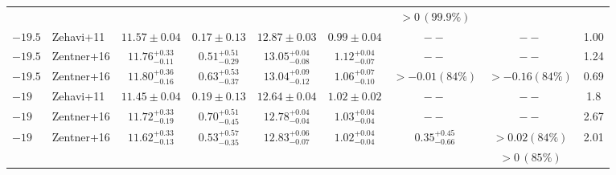\documentclass[usenatbib,usegraphicx,letterpaper]{mn2e}
\begin{document}
\begin{table}
{\begin{tabular}{l l c c c c c c c}
          &                     &                                         &                                       &                                         &                                      & $>0\, (99.9\%)$     &                                      & \vspace*{8pt}\\
$-19.5$ & Zehavi+11 & $11.57 \pm 0.04$ & $0.17 \pm 0.13$ & $12.87 \pm 0.03$ & $0.99 \pm 0.04$ & $--$ & $--$ & 1.00 \\
$-19.5$ & Zentner+16 & $11.76^{+0.33}_{-0.11}$ & $0.51^{+0.51}_{-0.29}$ & $13.05^{+0.04}_{-0.08}$ & $1.12^{+0.04}_{-0.07}$ & $--$ & $--$ & 1.24\\
$-19.5$ & Zentner+16 & $11.80^{+0.36}_{-0.16}$ & $0.63^{+0.53}_{-0.37}$ & $13.04^{+0.09}_{-0.12}$ & $1.06^{+0.07}_{-0.10}$ & $>-0.01 (84\%)$ & $>-0.16 (84\%)$ & 0.69 \vspace*{6pt}\\
%
$-19$ & Zehavi+11 & $11.45 \pm 0.04$ & $0.19 \pm 0.13$ & $12.64 \pm 0.04$ & $1.02 \pm 0.02$ & $--$ & $--$ & 1.8 \\
$-19$ & Zentner+16 & $11.72^{+0.33}_{-0.19}$ & $0.70^{+0.51}_{-0.45}$ & $12.78^{+0.04}_{-0.04}$ & $1.03^{+0.04}_{-0.04}$ & $--$ & $--$ & 2.67\\
$-19$ & Zentner+16 & $11.62^{+0.33}_{-0.13}$ & $0.53^{+0.57}_{-0.35}$ & $12.83^{+0.06}_{-0.07}$ & $1.02^{+0.04}_{-0.04}$ & $0.35^{+0.45}_{-0.66}$ & $>0.02 (84\%)$ & 2.01\\
          &                      &                                       &                                        &                                         &                                      &                                       & $>0\, (85\%)$ & \\

\end{tabular}}
\end{table}
\end{document}
